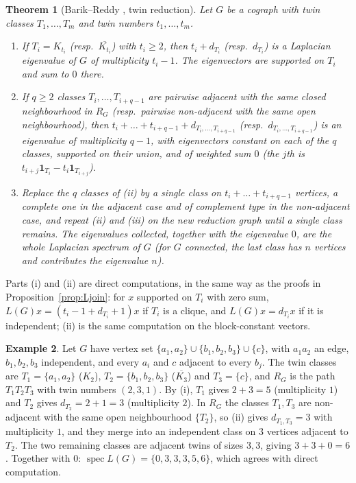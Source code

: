 \documentclass[11pt]{article}
\theoremstyle{plain}
\newtheorem{theorem}{Theorem}[section]
\theoremstyle{definition}
\newtheorem{example}[theorem]{Example}
\theoremstyle{remark}
\begin{document}
	\begin{theorem}[Barik--Reddy \cite{BarikReddy2023}, twin reduction]
		\label{thm:BR}
		Let $G$ be a cograph with twin classes $T_1,\dots,T_m$ and twin numbers $t_1,\dots,t_m$.
		\begin{enumerate}
			\item[\rm(i)] If $T_i=K_{t_i}$ (resp.\ $\overline{K_{t_i}}$) with $t_i\ge2$, then $t_i+d_{T_i}$ (resp.\ $d_{T_i}$) is a Laplacian eigenvalue of $G$ of multiplicity $t_i-1$. The eigenvectors are supported on $T_i$ and sum to $0$ there.
			\item[\rm(ii)] If $q\ge2$ classes $T_{i},\dots,T_{i+q-1}$ are pairwise adjacent with the same closed neighbourhood in $R_G$ (resp.\ pairwise non-adjacent with the same open neighbourhood), then $t_i+\dots+t_{i+q-1}+d_{T_i,\dots,T_{i+q-1}}$ (resp.\ $d_{T_i,\dots,T_{i+q-1}}$) is an eigenvalue of multiplicity $q-1$, with eigenvectors constant on each of the $q$ classes, supported on their union, and of weighted sum $0$ (the $j$th is $t_{i+j}\mathbf 1_{T_i}-t_i\mathbf 1_{T_{i+j}}$).
			\item[\rm(iii)] Replace the $q$ classes of {\rm(ii)} by a single class on $t_i+\dots+t_{i+q-1}$ vertices, a complete one in the adjacent case and of complement type in the non-adjacent case, and repeat (ii) and (iii) on the new reduction graph until a single class remains. The eigenvalues collected, together with the eigenvalue $0$, are the whole Laplacian spectrum of $G$ (for $G$ connected, the last class has $n$ vertices and contributes the eigenvalue $n$).
		\end{enumerate}
	\end{theorem}
	
	Parts (i) and (ii) are direct computations, in the same way as the proofs in Proposition~\ref{prop:Ljoin}: for $x$ supported on $T_i$ with zero sum, $L(G)x=(t_i-1+d_{T_i}+1)x$ if $T_i$ is a clique, and $L(G)x=d_{T_i}x$ if it is independent; (ii) is the same computation on the block-constant vectors.
	
	\begin{example}
		Let $G$ have vertex set $\{a_1,a_2\}\cup\{b_1,b_2,b_3\}\cup\{c\}$, with $a_1a_2$ an edge, $b_1,b_2,b_3$ independent, and every $a_i$ and $c$ adjacent to every $b_j$. The twin classes are $T_1=\{a_1,a_2\}$ ($K_2$), $T_2=\{b_1,b_2,b_3\}$ ($\overline{K_3}$) and $T_3=\{c\}$, and $R_G$ is the path $T_1T_2T_3$ with twin numbers $(2,3,1)$. By (i), $T_1$ gives $2+3=5$ (multiplicity $1$) and $T_2$ gives $d_{T_2}=2+1=3$ (multiplicity $2$). In $R_G$ the classes $T_1,T_3$ are non-adjacent with the same open neighbourhood $\{T_2\}$, so (ii) gives $d_{T_1,T_3}=3$ with multiplicity $1$, and they merge into an independent class on $3$ vertices adjacent to $T_2$. The two remaining classes are adjacent twins of sizes $3,3$, giving $3+3+0=6$. Together with $0$: $\operatorname{spec}L(G)=\{0,3,3,3,5,6\}$, which agrees with direct computation.
	\end{example}
	
\end{document}
